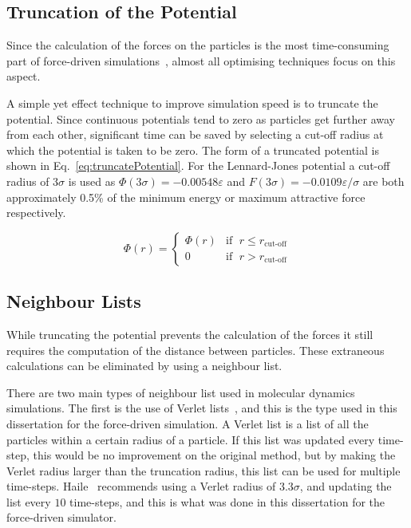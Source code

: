 \documentclass[12pt]{UoAthesis} \usepackage{booktabs}
\begin{document}
\subsection{Truncation of the Potential}
Since the calculation of the forces on the particles is the most
time-consuming part of force-driven simulations~\cite{Frenkel2002},
almost all optimising techniques focus on this aspect.

A simple yet effect technique to improve simulation speed is to
truncate the potential.  Since continuous potentials tend to zero as
particles get further away from each other, significant time can be
saved by selecting a cut-off radius at which the potential is taken to
be zero.  The form of a truncated potential is shown in
Eq.~\eqref{eq:truncatePotential}.  For the Lennard-Jones potential a
cut-off radius of $3\sigma$ is used as $\Phi(3\sigma) =
-0.00548\varepsilon$ and $F(3\sigma) = -0.0109\varepsilon/\sigma$ are
both approximately 0.5\% of the minimum energy or maximum attractive
force respectively.

\begin{equation}
  \label{eq:truncatePotential}
  \Phi(r) = 
  \begin{cases}
    \Phi(r) &\text{if }\; r \leq r_{\text{cut-off}} \\
    0 & \text{if }\; r > r_{\text{cut-off}} 
  \end{cases}
\end{equation}

\subsection{Neighbour Lists}
While truncating the potential prevents the calculation of the forces
it still requires the computation of the distance between particles.
These extraneous calculations can be eliminated by using a neighbour list.

There are two main types of neighbour list used in molecular dynamics
simulations.  The first is the use of Verlet lists~\cite{Verlet1967},
and this is the type used in this dissertation for the force-driven
simulation.  A Verlet list is a list of all the particles within a
certain radius of a particle.  If this list was updated every
time-step, this would be no improvement on the original method, but by
making the Verlet radius larger than the truncation radius, this list
can be used for multiple time-steps.  Haile~\cite{Haile1997} recommends
using a Verlet radius of $3.3\sigma$, and updating the list every $10$
time-steps, and this is what was done in this dissertation for the
force-driven simulator.
\end{document}
